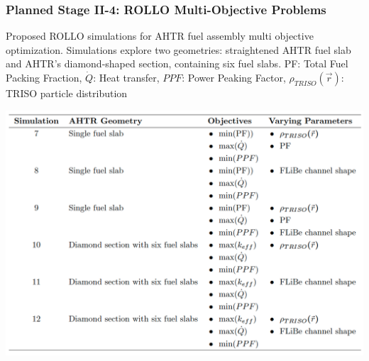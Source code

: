 \begin{frame}
    \frametitle{Planned Stage II-4: ROLLO Multi-Objective Problems}
    \begin{table}
        \caption{Proposed ROLLO simulations for AHTR fuel assembly multi 
        objective optimization. Simulations explore two geometries: straightened \gls{AHTR} 
        fuel slab and \gls{AHTR}'s diamond-shaped section, containing six fuel slabs.
        PF: Total Fuel Packing Fraction, $\dot{Q}$: Heat transfer, $PPF$: Power Peaking Factor, 
        $\rho_{TRISO}(\vec{r})$: \gls{TRISO} particle distribution}
        \includegraphics[width=0.7\linewidth]{figures/multi-obj.png}
    \end{table}
\end{frame}